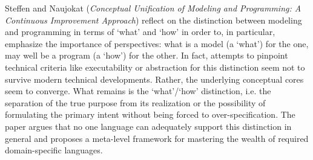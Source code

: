 


Steffen and Naujokat
\cite{isola-2016-steffen}
({\em Conceptual Unification of Modeling and Programming:
A Continuous Improvement Approach})
reflect on the distinction between modeling and programming  in terms of `what' and `how' in order to, in particular, emphasize the importance of perspectives: what is a model (a `what') for the one, may well be a program (a `how') for the other. In fact, attempts to pinpoint technical criteria like executability or abstraction for this distinction seem not to survive modern technical developments. Rather, the underlying conceptual cores seem to converge. What remains is the `what'/`how' distinction, i.e. the separation of the true purpose from its realization or the possibility of formulating the primary intent without being forced to over-specification. The paper argues that no one language can adequately support this distinction in general and proposes a meta-level framework for mastering the wealth of required domain-specific languages.

